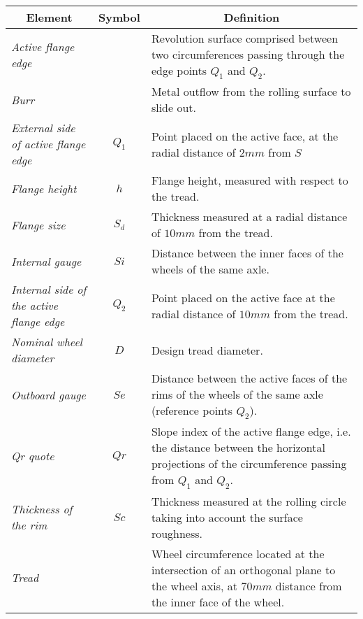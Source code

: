 \begin{longtable}{|p{3cm}|c|p{8cm}|}
  \hline
  \multicolumn{1}{|c|}{\textbf{Element}}       & \textbf{Symbol} & \multicolumn{1}{c|}{\textbf{Definition}} \\
  \hline
  
  \textit{Active flange edge}                           &                 & Revolution surface comprised between two circumferences passing through the edge points $Q_1$ and $Q_2$. \\
  \hline
  \textit{Burr}                                         &                 & Metal outflow from the rolling surface to slide out. \\
  \hline
  \textit{External side of active flange edge}          & $Q_1$           & Point placed on the active face, at the radial distance of $2 mm$ from $S$ \\
  \hline
  \textit{Flange height}                                &  $h$            & Flange height, measured with respect to the tread.\\
  \hline
  \textit{Flange size}                                  & $S_d$           & Thickness measured at a radial distance of $10 mm$ from the tread.\\
  \hline
  \textit{Internal gauge}                               & $Si$            & Distance between the inner faces of the wheels of the same axle.\\
  \hline
  \textit{Internal side of the active flange edge}      & $Q_2$           & Point placed on the active face at the radial distance of $10 mm$ from the tread. \\
  \hline
  \textit{Nominal wheel diameter}                       &  $D$            & Design tread diameter. \\
  \hline
  \textit{Outboard gauge}                               & $Se$            & Distance between the active faces of the rims of the wheels of the same axle (reference points $Q_2$). \\
  \hline
  \textit{Qr quote}                                     & $Qr$            & Slope index of the active flange edge, i.e. the distance between the horizontal projections of the circumference passing from $Q_1$ and $Q_2$. \\
  \hline
  \textit{Thickness of the rim}                         & $Sc$            & Thickness measured at the rolling circle taking into account the surface roughness.\\
  \hline
  \textit{Tread}                                        &                 & Wheel circumference located at the intersection of an orthogonal plane to the wheel axis, at $70 mm$ distance from the inner face of the wheel. \\

\end{longtable}

